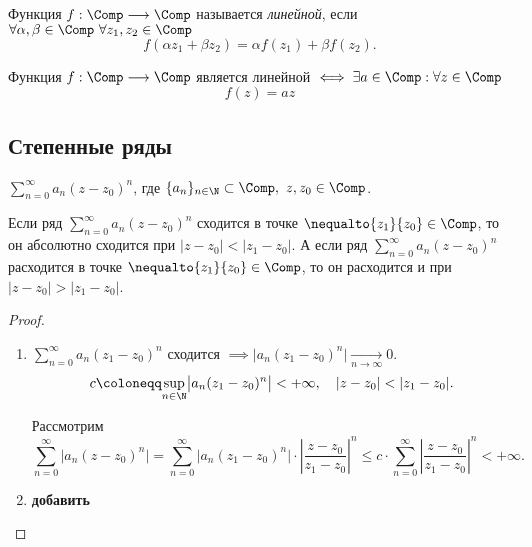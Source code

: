 \begin{definition}
    Функция $ f : \Comp \longrightarrow \Comp $ называется \emph{линейной}, если $ \forall \alpha, \beta \in \Comp \ \forall z_1,z_2 \in \Comp $
    \[
        f(\alpha z_1 + \beta z_2) = \alpha f(z_1) + \beta f(z_2).
    \]
\end{definition}

\begin{remark}
    Функция $ f: \Comp \longrightarrow \Comp $ является линейной $ \iff \exists a \in \Comp : \forall z \in \Comp $
    \[
        f(z) = az
    \]
\end{remark}

\subsection{Степенные ряды}

\begin{note}
    $ \sum_{n=0}^{\infty}a_n(z-z_0)^n $, где $ \{a_n\}_{n\in\N} \subset \Comp, \ z,z_0 \in \Comp $.
\end{note}

\begin{theorem}
    Если ряд $ \sum_{n=0}^{\infty}a_n(z-z_0)^n $ сходится в точке $ \nequalto{z_1}{z_0} \in \Comp $, то он абсолютно сходится при $ | z - z_0 | < | z_1 - z_0 | $. А если ряд $ \sum_{n=0}^{\infty}a_n(z - z_0)^n $ расходится в точке $ \nequalto{z_1}{z_0} \in \Comp $, то он расходится и при $ | z - z_0 | > | z_1 - z_0 | $.
\end{theorem}

\begin{proof}\leavevmode
    \begin{enumerate}
        \item $ \sum_{n=0}^{\infty}a_n(z_1 - z_0)^n $ сходится $ \implies \big|a_n(z_1 - z_0)^n\big| \xrightarrow[n \rightarrow\infty]{} 0 $.
              \[
                  c \coloneqq \underset{n\in\N}{\sup} \big|a_n(z_1 - z_0)^n\big| < +\infty, \quad | z - z_0 | < | z_1 - z_0 |.
              \]

              Рассмотрим
              \[
                  \sum_{n=0}^{\infty}\big|a_n(z-z_0)^n\big| = \sum_{n=0}^{\infty}\big|a_n(z_1 - z_0)^n\big|\cdot \left|\frac{z-z_0}{z_1-z_0}\right|^n \leqslant c \cdot \sum_{n=0}^{\infty}\left|\frac{z-z_0}{z_1-z_0}\right|^n < + \infty.
              \]
        \item \textbf{добавить}
    \end{enumerate}
\end{proof}

